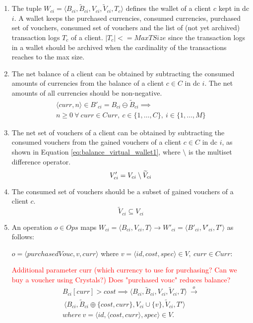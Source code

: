 \begin{enumerate}
	\item The tuple $W_{ci} = \langle B_{ci}, \widetilde{B}_{ci}, V_{ci}, \widetilde{V}_{ci}, T_{c} \rangle$ defines the wallet of a client $c$ kept in \gls{dc} $i$. A wallet keeps the purchased currencies, consumed currencies, purchased set of vouchers, consumed set of vouchers and the list of (not yet archived) transaction logs $T_{c}$ of a client. $|T_{c}| <= MaxTSize$ since the transaction logs in a wallet should be archived when the cardinality of the transactions reaches to the max size.

	\item The net balance of a client can be obtained by subtracting the consumed amounts of currencies from the balance of a client $c \in C$ in \gls{dc} $i$. The net amounts of all currencies should be non-negative.
	\begin{multline}  \label{eq:balance_virtual_wallet}
		\langle curr, n \rangle \in B'_{ci} = B_{ci} \ominus \widetilde{B}_{ci} \implies \\
		n \ge 0 ~ \forall ~  curr \in Curr, ~  c \in \{1,\dots, C\},  ~  i \in \{1,\dots, M\} 
	\end{multline}

	\item The net set of vouchers of a client can be obtained by subtracting the consumed vouchers from the gained vouchers of a client $c \in C$ in \gls{dc} $i$, as shown in Equation \ref{eq:balance_virtual_wallet1}, where $\setminus$ is the multiset difference operator.
	\begin{equation} \label{eq:balance_virtual_wallet1}
		V'_{ci} = V_{ci} \setminus \widetilde{V}_{ci} \\
	\end{equation}
  
	\item The consumed set of vouchers should be a subset of gained vouchers of a client $c$.
	\begin{equation}  \label{eq:balance_virtual_wallet2}
		\widetilde{V}_{ci} \subseteq V_{ci}   
	\end{equation}
		
	\item An operation $o \in Ops$ maps $W_{ci} = \langle B_{ci}, V_{ci}, T \rangle \rightarrow W'_{ci} = \langle B'_{ci}, V'_{ci}, T' \rangle$ as follows: 
		
	$o = \langle purchasedVouc, v, curr \rangle$ where $v=\langle id, cost, spec \rangle \in V, ~ curr \in Curr$:
	
	\textcolor{red}{Additional parameter curr (which currency to use for purchasing? Can we buy a voucher using Crystals?) Does "purchased vouc" reduces balance? }
	\begin{multline} \label{eq:purchaseItem_virtual_wallet}
		 B_{ci}[curr] > cost \implies \langle B_{ci}, \widetilde{B}_{ci}, V_{ci}, \widetilde{V}_{ci}, T \rangle ~ \overset{o}{\rightarrow} \\
	    ~ \langle B_{ci}, \widetilde{B}_{ci} \oplus \{cost, curr\}, V_{ci} \cup \{v\}, \widetilde{V}_{ci}, T' \rangle \\
	    where ~ v = \langle id, \langle cost, curr \rangle, spec \rangle \in V.
	\end{multline}
	

\end{enumerate}

